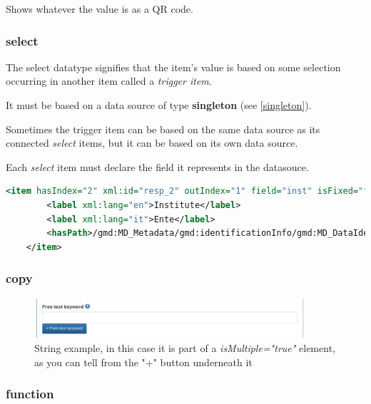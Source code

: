 \documentclass[10pt]{article}
\begin{document}
Shows whatever the value is as a QR code.


\subsubsection{select}
\label{select}

The select datatype signifies that the item's value is based on some selection occurring in another item called a \textit{trigger item}.

It must be based on a data source of type \textbf{singleton} (see \ref{singleton}).

Sometimes the trigger item can be based on the same data source as its connected \textit{select} items, but it can be based on its own data source.

Each \textit{select} item must declare the field it represents in the datasouce.

\begin{lstlisting}[language=xml]
	<item hasIndex="2" xml:id="resp_2" outIndex="1" field="inst" isFixed="false" hasDatatype="select" datasource="personS_2">
		<label xml:lang="en">Institute</label>
		<label xml:lang="it">Ente</label>
		<hasPath>/gmd:MD_Metadata/gmd:identificationInfo/gmd:MD_DataIdentification/gmd:citation/gmd:CI_Citation/gmd:citedResponsibleParty/gmd:CI_ResponsibleParty/gmd:organisationName/gco:CharacterString</hasPath>
	</item>
\end{lstlisting}

\subsubsection{copy}
\label{copy}

\begin{figure}[h]
	\caption{String example, in this case it is part of a \textit{isMultiple="true"} element, as you can tell from the "+" button underneath it}
	\includegraphics[width=10cm]{String.png}
	\centering
\end{figure}



\subsubsection{function}
\label{function}
\end{document}
